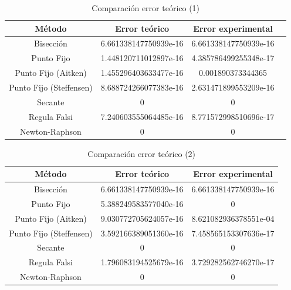 \documentclass{memoria}
\begin{document}
\begin{table}[H]
\begin{tabular}{|c|c|c|c|}
\hline
\textbf{Método} & \textbf{Error teórico} & \textbf{Error experimental}\\ \hline
Bisección      & 6.661338147750939e-16  & 6.661338147750939e-16\\ \hline
Punto Fijo      & 1.448120711012897e-16  & 4.385786499255348e-17\\ \hline
Punto Fijo (Aitken) & 1.455296403633477e-16 & 0.001890373344365\\ \hline
Punto Fijo (Steffensen)& 8.688724266077383e-16 & 2.631471899553209e-16\\ \hline
Secante       & 0  & 0\\ \hline
Regula Falsi   & 7.240603555064485e-16 & 8.771572998510696e-17\\ \hline
Newton-Raphson  & 0 & 0\\ \hline
\end{tabular}
\caption{Comparación error teórico (1)}
\label{tab:my_label}
\end{table}

\begin{table}
\centering
\begin{tabular}{|c|c|c|}
\hline
\textbf{Método} & \textbf{Error teórico} & \textbf{Error experimental}\\ \hline
Bisección       & 6.661338147750939e-16 & 6.661338147750939e-16\\ \hline
Punto Fijo      & 5.388249583577040e-16 & 0\\ \hline
Punto Fijo (Aitken) & 9.030772705624057e-16 & 8.621082936378551e-04\\ \hline
Punto Fijo (Steffensen) & 3.592166389051360e-16 & 7.458565153307636e-17\\ \hline
Secante         & 0 & 0\\ \hline
Regula Falsi    & 1.796083194525679e-16 & 3.729282562746270e-17\\ \hline
Newton-Raphson   & 0 & 0\\ \hline
\end{tabular}
\caption{Comparación error teórico (2)}
    \label{tab:my_label}
\end{table}
\end{document}
